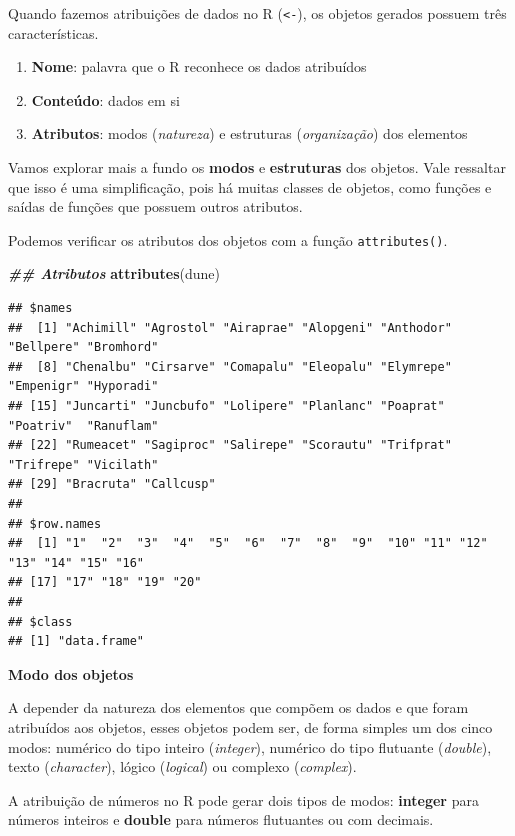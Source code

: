 \documentclass[
]{article}
\newenvironment{Shaded}{\begin{snugshade}}{\end{snugshade}}
\newcommand{\DocumentationTok}[1]{\textcolor[rgb]{0.56,0.35,0.01}{\textbf{\textit{#1}}}}
\newcommand{\FunctionTok}[1]{\textcolor[rgb]{0.13,0.29,0.53}{\textbf{#1}}}
\newcommand{\NormalTok}[1]{#1}
\providecommand{\tightlist}{%
  \setlength{\itemsep}{0pt}\setlength{\parskip}{0pt}}
\begin{document}
Quando fazemos atribuições de dados no R (\texttt{\textless{}-}), os objetos gerados possuem três características.

\begin{enumerate}
\def\labelenumi{\arabic{enumi}.}
\tightlist
\item
  \textbf{Nome}: palavra que o R reconhece os dados atribuídos
\item
  \textbf{Conteúdo}: dados em si
\item
  \textbf{Atributos}: modos (\emph{natureza}) e estruturas (\emph{organização}) dos elementos
\end{enumerate}

Vamos explorar mais a fundo os \textbf{modos} e \textbf{estruturas} dos objetos. Vale ressaltar que isso é uma simplificação, pois há muitas classes de objetos, como funções e saídas de funções que possuem outros atributos.

Podemos verificar os atributos dos objetos com a função \texttt{attributes()}.

\begin{Shaded}
\begin{Highlighting}[]
\DocumentationTok{\#\# Atributos}
\FunctionTok{attributes}\NormalTok{(dune)}
\end{Highlighting}
\end{Shaded}

\begin{verbatim}
## $names
##  [1] "Achimill" "Agrostol" "Airaprae" "Alopgeni" "Anthodor" "Bellpere" "Bromhord"
##  [8] "Chenalbu" "Cirsarve" "Comapalu" "Eleopalu" "Elymrepe" "Empenigr" "Hyporadi"
## [15] "Juncarti" "Juncbufo" "Lolipere" "Planlanc" "Poaprat"  "Poatriv"  "Ranuflam"
## [22] "Rumeacet" "Sagiproc" "Salirepe" "Scorautu" "Trifprat" "Trifrepe" "Vicilath"
## [29] "Bracruta" "Callcusp"
## 
## $row.names
##  [1] "1"  "2"  "3"  "4"  "5"  "6"  "7"  "8"  "9"  "10" "11" "12" "13" "14" "15" "16"
## [17] "17" "18" "19" "20"
## 
## $class
## [1] "data.frame"
\end{verbatim}

\textbf{Modo dos objetos}

A depender da natureza dos elementos que compõem os dados e que foram atribuídos aos objetos, esses objetos podem ser, de forma simples um dos cinco modos: numérico do tipo inteiro (\emph{integer}), numérico do tipo flutuante (\emph{double}), texto (\emph{character}), lógico (\emph{logical}) ou complexo (\emph{complex}).

A atribuição de números no R pode gerar dois tipos de modos: \textbf{integer} para números inteiros e \textbf{double} para números flutuantes ou com decimais.
\end{document}
